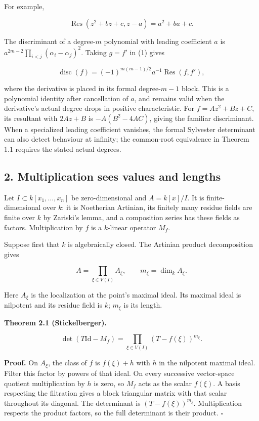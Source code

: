 \documentclass[
]{article}
\begin{document}
For example,

\[
\operatorname{Res}(z^2+bz+c,z-a)=a^2+ba+c.
\]

The discriminant of a degree-\(m\) polynomial with leading coefficient
\(a\) is \(a^{2m-2}\prod_{i<j}(\alpha_i-\alpha_j)^2\). Taking \(g=f'\)
in (1) gives

\[
\operatorname{disc}(f)=(-1)^{m(m-1)/2}a^{-1}\operatorname{Res}(f,f'),
\tag{3}
\]

where the derivative is placed in its formal degree-\(m-1\) block. This
is a polynomial identity after cancellation of \(a\), and remains valid
when the derivative's actual degree drops in positive characteristic.
For \(f=Az^2+Bz+C\), its resultant with \(2Az+B\) is \(-A(B^2-4AC)\),
giving the familiar discriminant. When a specialized leading coefficient
vanishes, the formal Sylvester determinant can also detect behaviour at
infinity; the common-root equivalence in Theorem 1.1 requires the stated
actual degrees.

\subsection{2. Multiplication sees values and
lengths}\label{multiplication-sees-values-and-lengths}

Let \(I\subset k[x_1,\ldots,x_n]\) be zero-dimensional and \(A=k[x]/I\).
It is finite-dimensional over \(k\): it is Noetherian Artinian, its
finitely many residue fields are finite over \(k\) by Zariski's lemma,
and a composition series has these fields as factors. Multiplication by
\(f\) is a \(k\)-linear operator \(M_f\).

Suppose first that \(k\) is algebraically closed. The Artinian product
decomposition gives

\[
A=\prod_{\xi\in V(I)}A_\xi,
\qquad m_\xi=\dim_k A_\xi.
\]

Here \(A_\xi\) is the localization at the point's maximal ideal. Its
maximal ideal is nilpotent and its residue field is \(k\); \(m_\xi\) is
its length.

\textbf{Theorem 2.1 (Stickelberger).}

\[
\det(T\mathrm{Id}-M_f)=\prod_{\xi\in V(I)}(T-f(\xi))^{m_\xi}.
\tag{4}
\]

\textbf{Proof.} On \(A_\xi\), the class of \(f\) is \(f(\xi)+h\) with
\(h\) in the nilpotent maximal ideal. Filter this factor by powers of
that ideal. On every successive vector-space quotient multiplication by
\(h\) is zero, so \(M_f\) acts as the scalar \(f(\xi)\). A basis
respecting the filtration gives a block triangular matrix with that
scalar throughout its diagonal. The determinant is
\((T-f(\xi))^{m_\xi}\). Multiplication respects the product factors, so
the full determinant is their product. \(\square\)
\end{document}
